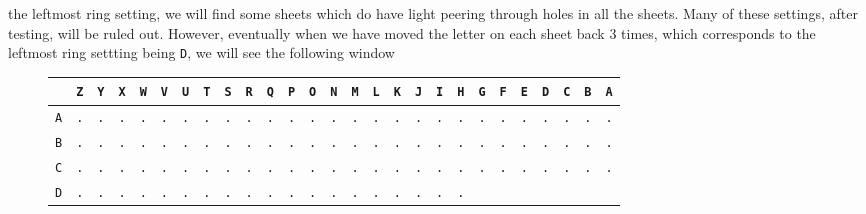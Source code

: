 the leftmost ring setting, we will find some sheets which do have
light peering through holes in all the sheets. Many of these
settings, after testing, will be ruled out. However, eventually when
we have moved the letter on each sheet back $3$ times, which
corresponds to the leftmost ring settting being \texttt{D}, we will
see the following window
\begin{figure}[H]
	\begin{center}
		\scalebox{0.5} {
			\begin{tabular}{c|cccccccccccccccccccccccccc}
				           & \texttt{Z} & \texttt{Y} & \texttt{X} & \texttt{W} &
				\texttt{V} & \texttt{U} & \texttt{T} & \texttt{S} &
				\texttt{R} & \texttt{Q} & \texttt{P} & \texttt{O} &
				\texttt{N} & \texttt{M} & \texttt{L} & \texttt{K} &
				\texttt{J} & \texttt{I} & \texttt{H} & \texttt{G} &
				\texttt{F} & \texttt{E} & \texttt{D} & \texttt{C} &
				\texttt{B} & \texttt{A}
				\\ \hline
				\texttt{A} & \texttt{.} & \texttt{.} & \texttt{.} &
				\texttt{.} & \texttt{.} & \texttt{.} & \texttt{.} &
				\texttt{.} & \texttt{.} & \texttt{.} & \texttt{.} &
				\texttt{.} & \texttt{.} & \texttt{.} & \texttt{.} &
				\texttt{.} & \texttt{.} & \texttt{.} & \texttt{.} &
				\texttt{.} & \texttt{.} & \texttt{.} & \texttt{.} &
				\texttt{.} & \texttt{.} & \texttt{.}                             \\
				\texttt{B} & \texttt{.} & \texttt{.} & \texttt{.} &
				\texttt{.} & \texttt{.} & \texttt{.} & \texttt{.} &
				\texttt{.} & \texttt{.} & \texttt{.} & \texttt{.} &
				\texttt{.} & \texttt{.} & \texttt{.} & \texttt{.} &
				\texttt{.} & \texttt{.} & \texttt{.} & \texttt{.} &
				\texttt{.} & \texttt{.} & \texttt{.} & \texttt{.} &
				\texttt{.} & \texttt{.} & \texttt{.}                             \\
				\texttt{C} & \texttt{.} & \texttt{.} & \texttt{.} &
				\texttt{.} & \texttt{.} & \texttt{.} & \texttt{.} &
				\texttt{.} & \texttt{.} & \texttt{.} & \texttt{.} &
				\texttt{.} & \texttt{.} & \texttt{.} & \texttt{.} &
				\texttt{.} & \texttt{.} & \texttt{.} & \texttt{.} &
				\texttt{.} & \texttt{.} & \texttt{.} & \texttt{.} &
				\texttt{.} & \texttt{.} & \texttt{.}                             \\
				\texttt{D} & \texttt{.} & \texttt{.} & \texttt{.} &
				\texttt{.} & \texttt{.} & \texttt{.} & \texttt{.} &
				\texttt{.} & \texttt{.} & \texttt{.} & \texttt{.} &
				\texttt{.} & \texttt{.} & \texttt{.} & \texttt{.} &
				\texttt{.} & \texttt{.} & \texttt{.} & \texttt{.} &

\end{tabular}}
\end{center}
\end{figure}
